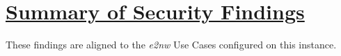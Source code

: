 %
%
%

\chapter[Summary of Security Findings]{\underline{Summary of Security Findings}}
%
These findings are aligned to the \textit{e2nw} Use Cases configured on this instance.\\


